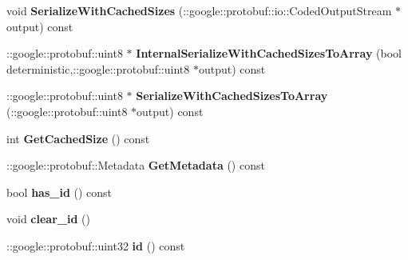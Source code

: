 \begin{DoxyCompactItemize}
\item 
void {\bfseries Serialize\+With\+Cached\+Sizes} (\+::google\+::protobuf\+::io\+::\+Coded\+Output\+Stream $\ast$output) const \hypertarget{classvss__command_1_1Robot__Command_add920699d3f456d9335a4fbacf4a1fa5}{}\label{classvss__command_1_1Robot__Command_add920699d3f456d9335a4fbacf4a1fa5}

\item 
\+::google\+::protobuf\+::uint8 $\ast$ {\bfseries Internal\+Serialize\+With\+Cached\+Sizes\+To\+Array} (bool deterministic,\+::google\+::protobuf\+::uint8 $\ast$output) const \hypertarget{classvss__command_1_1Robot__Command_a4ab1a2204defe3b1c6930b295607f00d}{}\label{classvss__command_1_1Robot__Command_a4ab1a2204defe3b1c6930b295607f00d}

\item 
\+::google\+::protobuf\+::uint8 $\ast$ {\bfseries Serialize\+With\+Cached\+Sizes\+To\+Array} (\+::google\+::protobuf\+::uint8 $\ast$output) const \hypertarget{classvss__command_1_1Robot__Command_aaa2b9a287b4ac50966156dbca7ec50e1}{}\label{classvss__command_1_1Robot__Command_aaa2b9a287b4ac50966156dbca7ec50e1}

\item 
int {\bfseries Get\+Cached\+Size} () const \hypertarget{classvss__command_1_1Robot__Command_a45dc66dc5c38e988073141707b083dae}{}\label{classvss__command_1_1Robot__Command_a45dc66dc5c38e988073141707b083dae}

\item 
\+::google\+::protobuf\+::\+Metadata {\bfseries Get\+Metadata} () const \hypertarget{classvss__command_1_1Robot__Command_a5383c49b5b6ef83dc3b9ac3ab2dd870a}{}\label{classvss__command_1_1Robot__Command_a5383c49b5b6ef83dc3b9ac3ab2dd870a}

\item 
bool {\bfseries has\+\_\+id} () const \hypertarget{classvss__command_1_1Robot__Command_ab636015fe88af27ccaf824159805442d}{}\label{classvss__command_1_1Robot__Command_ab636015fe88af27ccaf824159805442d}

\item 
void {\bfseries clear\+\_\+id} ()\hypertarget{classvss__command_1_1Robot__Command_a0b684f61267d6e251f068f1b2a4c772f}{}\label{classvss__command_1_1Robot__Command_a0b684f61267d6e251f068f1b2a4c772f}

\item 
\+::google\+::protobuf\+::uint32 {\bfseries id} () const \hypertarget{classvss__command_1_1Robot__Command_a632b1e7c37152ca3ecca6e45547faa94}{}\label{classvss__command_1_1Robot__Command_a632b1e7c37152ca3ecca6e45547faa94}


\end{DoxyCompactItemize}
